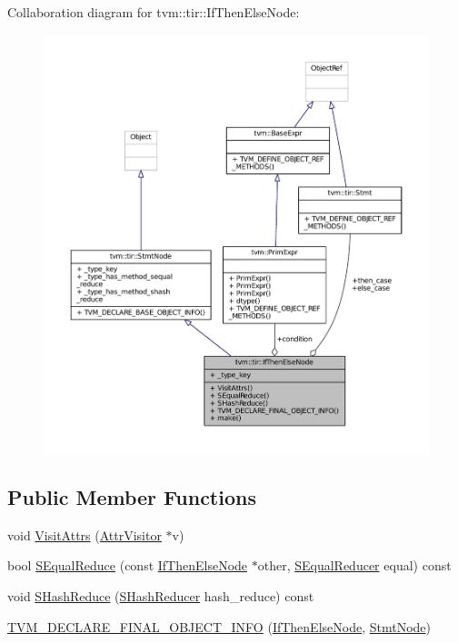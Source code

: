 Collaboration diagram for tvm\+:\+:tir\+:\+:If\+Then\+Else\+Node\+:
\nopagebreak
\begin{figure}[H]
\begin{center}
\leavevmode
\includegraphics[width=350pt]{classtvm_1_1tir_1_1IfThenElseNode__coll__graph}
\end{center}
\end{figure}
\subsection*{Public Member Functions}
\begin{DoxyCompactItemize}
\item 
void \hyperlink{classtvm_1_1tir_1_1IfThenElseNode_a2ef091a7dcdd9b8e2727845a347440f7}{Visit\+Attrs} (\hyperlink{classtvm_1_1AttrVisitor}{Attr\+Visitor} $\ast$v)
\item 
bool \hyperlink{classtvm_1_1tir_1_1IfThenElseNode_aad170a1bd7dfb883293bc3e659f12629}{S\+Equal\+Reduce} (const \hyperlink{classtvm_1_1tir_1_1IfThenElseNode}{If\+Then\+Else\+Node} $\ast$other, \hyperlink{classtvm_1_1SEqualReducer}{S\+Equal\+Reducer} equal) const 
\item 
void \hyperlink{classtvm_1_1tir_1_1IfThenElseNode_a7256066989ee7eac23ff8bb30f47b449}{S\+Hash\+Reduce} (\hyperlink{classtvm_1_1SHashReducer}{S\+Hash\+Reducer} hash\+\_\+reduce) const 
\item 
\hyperlink{classtvm_1_1tir_1_1IfThenElseNode_a9c7a3802bbad50ed9d9ee6bc077be7cd}{T\+V\+M\+\_\+\+D\+E\+C\+L\+A\+R\+E\+\_\+\+F\+I\+N\+A\+L\+\_\+\+O\+B\+J\+E\+C\+T\+\_\+\+I\+N\+FO} (\hyperlink{classtvm_1_1tir_1_1IfThenElseNode}{If\+Then\+Else\+Node}, \hyperlink{classtvm_1_1tir_1_1StmtNode}{Stmt\+Node})
\end{DoxyCompactItemize}

